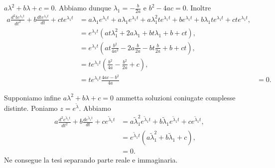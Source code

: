 $a\lambda^2 + b\lambda + c = 0$.
Abbiamo dunque
$\lambda_1 = - \frac{b}{2a}$
e
$b^2 - 4 ac = 0$. Inoltre 
\begin{align*}
  a \frac{d^2 t e^{\lambda_1 t}}{dt^2}
  + b \frac{d t e^{\lambda_1 t}}{dt}
  + c t e^{\lambda_1 t}
  &= a \lambda_1 e^{\lambda_1 t}
  + a \lambda_1 e^{\lambda_1 t}
  + a \lambda_1^2 t e^{\lambda_1 t}
  + b e^{\lambda_1 t}
  + b \lambda_1 t e^{\lambda_1 t}
  + c t e^{\lambda_1 t},\\
  &= e^{\lambda_1 t}
    (at \lambda_1^2 + 2a \lambda_1 + bt \lambda_1 + b + c t),\\
  &= e^{\lambda_1 t}
    (a t \frac{b^2}{4 a^2} - 2a \frac{b}{2a} - bt \frac{b}{2 a} + b + ct),\\
  &= t e^{\lambda_1 t}
    (\frac{b^2}{4a} -  \frac{b^2}{2a} + c),\\
  &= t e^{\lambda_1 t}
    \frac{4ac - b^2}{4a}
  &= 0.
\end{align*}
\par Supponiamo infine
$a\lambda^2 + b\lambda + c = 0$
ammetta soluzioni coniugate complesse distinte.
Poniamo $z = e^{\tilde{\lambda}}$. Abbiamo
\begin{align*}
  a \frac{d^2 e^{\tilde{\lambda}_1 t}}{dt^2}
  + b \frac{d e^{\tilde{\lambda}_1 t}}{dt}
  + c e^{\tilde{\lambda}_1 t}
  &= a \tilde{\lambda}_1^2 e^{\tilde{\lambda}_1 t}
  + b \tilde{\lambda}_1 e^{\tilde{\lambda}_1 t}
  + c e^{\tilde{\lambda}_1 t},\\
  &= e^{\tilde{\lambda}_1 t} (a \tilde{\lambda}_1^2 + b \tilde{\lambda}_1 + c),\\
  &= 0.
\end{align*}
Ne consegue la tesi separando parte reale e immaginaria. \EndProof
